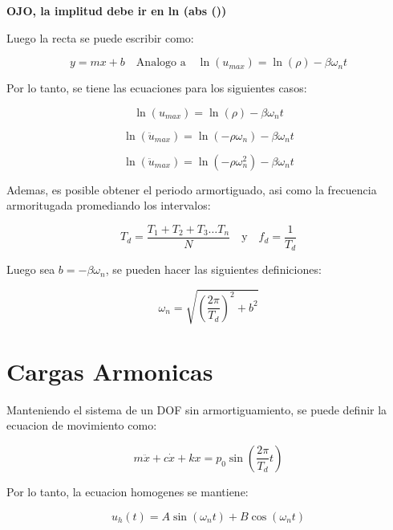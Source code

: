 \documentclass{article}  %
\begin{document}
\textbf{OJO, la implitud debe ir en ln (abs ())}

Luego la recta se puede escribir como:

\begin{equation}
    y = mx + b \quad \text{Analogo a} \quad \ln(u_{max}) = \ln(\rho) - \beta \omega_n t
\end{equation}

Por lo tanto, se tiene las ecuaciones para los siguientes casos:

\begin{equation}
    \ln(u_{max}) = \ln(\rho) - \beta \omega_n t
\end{equation}

\begin{equation}
    \ln(\ddot{u}_{max}) = \ln(-\rho \omega_n) - \beta \omega_n t
\end{equation}

\begin{equation}
    \ln(\ddot{u}_{max}) = \ln(-\rho \omega^2_n) - \beta \omega_n t
\end{equation}


Ademas, es posible obtener el periodo armortiguado, asi como la frecuencia armoritugada promediando los intervalos:

\begin{equation}
    T_d = \frac{T_1 + T_2 + T_3 \dots T_n}{N} \quad \text{y} \quad f_d = \frac{1}{T_d}
\end{equation}

Luego sea $b = -\beta \omega_n$, se pueden hacer las siguientes definiciones:

\begin{equation}
    \omega_n = \sqrt{(\frac{2 \pi}{T_d})^2 + b^2 } 
\end{equation}

\section{Cargas Armonicas}

Manteniendo el sistema de un DOF sin armortiguamiento, se puede definir la ecuacion de movimiento como:

\begin{equation}
    m \ddot{x} + c \dot{x} + kx = p_0 \sin(\frac{2\pi}{T_d}t)
\end{equation}

Por lo tanto, la ecuacion homogenes se mantiene:

\begin{equation}
    u_h(t) = A \sin(\omega_n t) + B \cos(\omega_n t)
\end{equation}
\end{document}
